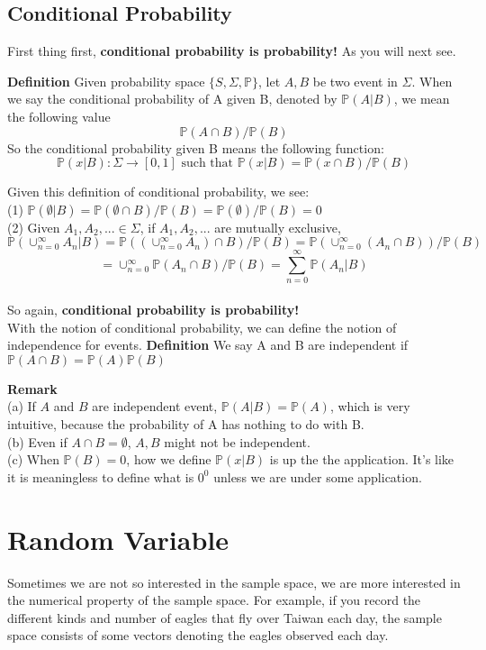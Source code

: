 \documentclass[a4paper,12pt]{article}
\begin{document}
\subsection{Conditional Probability}
First thing first, \textbf{conditional probability is probability!} As you will next see.

\textbf{Definition} Given probability space $\{ S, \Sigma,  \mathbb{P}\}$, let $A, B$ be two event in $\Sigma$. When we say the conditional probability of A given B, denoted by $\mathbb{P}(A|B) $, we mean the following value $$\mathbb{P}(A\cap B)/\mathbb{P}(B)$$
So the conditional probability given B means the following function:
$$\mathbb{P}(x|B): \Sigma \to [0, 1] \text{ such that } \mathbb{P}(x|B) = \mathbb{P}(x\cap B)/\mathbb{P}(B)$$

Given this definition of conditional probability, we see:\\
(1) $\mathbb{P}(\emptyset|B) = \mathbb{P}(\emptyset\cap B)/\mathbb{P}(B) = \mathbb{P}(\emptyset)/\mathbb{P}(B) = 0$\\
(2) Given $A_1, A_2, ... \in \Sigma$, if $A_1, A_2, ...$ are mutually exclusive, $$\mathbb{P}( \cup_{n=0}^\infty A_n |B ) = \mathbb{P}( (\cup_{n=0}^\infty A_n) \cap B ) /  \mathbb{P}(B)= \mathbb{P}( \cup_{n=0}^\infty (A_n \cap B) ) /  \mathbb{P}(B)$$
$$= \cup_{n=0}^\infty \mathbb{P} ( A_n \cap B ) / \mathbb{P}(B) = \sum_{n=0}^\infty \mathbb{P}(A_n | B)$$\\

So again, \textbf{conditional probability is probability!}\\

With the notion of conditional probability, we can define the notion of independence for events.
\textbf{Definition} We say A and B are independent if $\mathbb{P}(A \cap B) = \mathbb{P}(A) \mathbb{P}(B)$

\textbf{Remark}\\
(a) If $A$ and $B$ are independent event, $\mathbb{P}(A|B) = \mathbb{P}(A)$, which is very intuitive, because the probability of A has nothing to do with B.\\
(b) Even if $A \cap B = \emptyset$, $A, B$ might not be independent.\\
(c) When $\mathbb{P}(B) = 0$, how we define $\mathbb{P}(x|B)$ is up the the application. It's like it is meaningless to define what is $0^0$ unless we are under some application.\\

\newpage
\section{Random Variable}
Sometimes we are not so interested in the sample space, we are more interested in the numerical property of the sample space. For example, if you record the different kinds and number of eagles that fly over Taiwan each day, the sample space consists of some vectors denoting the eagles observed each day.
\end{document}
